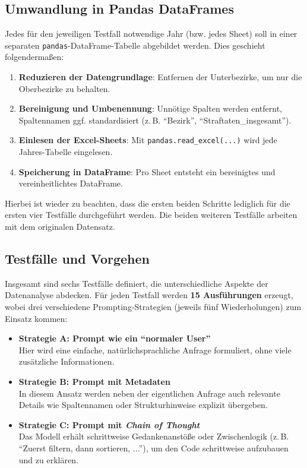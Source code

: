 \documentclass[11pt,a4paper]{article}
\begin{document}
\subsection{Umwandlung in Pandas DataFrames}
Jedes für den jeweiligen Testfall notwendige Jahr (bzw. jedes Sheet) soll in einer separaten \texttt{pandas}-DataFrame-Tabelle abgebildet werden. Dies geschieht folgendermaßen:
\begin{enumerate}
    \item \textbf{Reduzieren der Datengrundlage}: Entfernen der Unterbezirke, um nur die Oberbezirke zu behalten.
    \item \textbf{Bereinigung und Umbenennung}: Unnötige Spalten werden entfernt, Spaltennamen ggf. standardisiert (z.\,B. \enquote{Bezirk}, \enquote{Straftaten\_insgesamt}).
    \item \textbf{Einlesen der Excel-Sheets}: Mit \texttt{pandas.read\_excel(...)} wird jede Jahres-Tabelle eingelesen.
    \item \textbf{Speicherung in DataFrame}: Pro Sheet entsteht ein bereinigtes und vereinheitlichtes DataFrame.
\end{enumerate}
Hierbei ist wieder zu beachten, dass die ersten beiden Schritte lediglich für die ersten vier Testfälle durchgeführt werden. Die beiden weiteren Testfälle arbeiten mit dem originalen Datensatz.

\subsection{Testfälle und Vorgehen}
Insgesamt sind sechs Testfälle definiert, die unterschiedliche Aspekte der Datenanalyse abdecken. Für jeden Testfall werden \textbf{15 Ausführungen} erzeugt, wobei drei verschiedene Prompting-Strategien (jeweils fünf Wiederholungen) zum Einsatz kommen:
\begin{itemize}
    \label{itemize:promptingstrategien}
    \item \textbf{Strategie A: Prompt wie ein \enquote{normaler User}}\\
    Hier wird eine einfache, natürlichsprachliche Anfrage formuliert, ohne viele zusätzliche Informationen.
    \item \textbf{Strategie B: Prompt mit Metadaten}\\
    In diesem Ansatz werden neben der eigentlichen Anfrage auch relevante Details wie Spaltennamen oder Strukturhinweise explizit übergeben.
    \item \textbf{Strategie C: Prompt mit \emph{Chain of Thought}}\\
    Das Modell erhält schrittweise Gedankenanstöße oder Zwischenlogik (z.\,B. \enquote{Zuerst filtern, dann sortieren, ...}), um den Code schrittweise aufzubauen und zu erklären.
\end{itemize}
\end{document}
